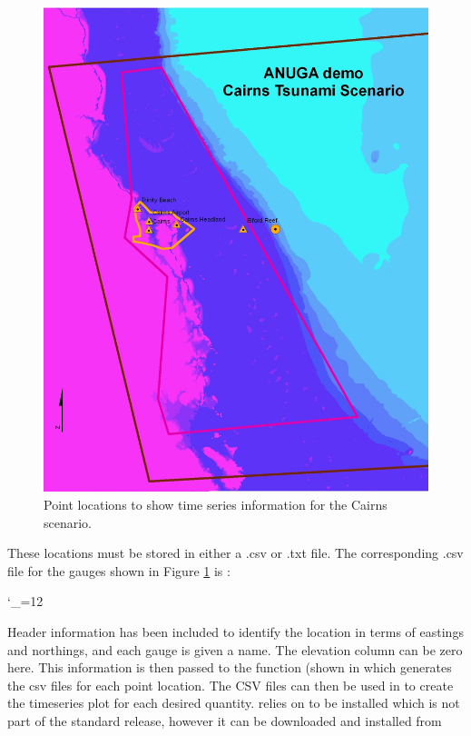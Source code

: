 \documentclass{manual}
\newcommand{\verbatiminputB}[1]{%
\endgroup}
\def\verbatiminputunderscore{\begingroup 
\catcode`\_=12
\verbatiminputB}
\begin{document}
\begin{figure}[htp]
  \centerline{\includegraphics[scale=0.5]{graphics/cairnsgauges.jpg}}
  \caption{Point locations to show time series information for the Cairns scenario.}
  \label{fig:cairnsgauges}
\end{figure}

These locations
must be stored in either a .csv or .txt file. The corresponding .csv file for
the gauges shown in Figure \ref{fig:cairnsgauges} is :

\verbatiminputunderscore{../../anuga_core/examples/cairns/gauges.csv}

Header information has been included to identify the location in terms of eastings and
northings, and each gauge is given a name. The elevation column can be zero here.
This information is then passed to the function  (shown in
 which generates the csv files for each point location. The CSV files
can then be used in  to create the timeseries plot for each desired
quantity.  relies on  to be installed which is not part
of the standard  release, however it can be downloaded and installed from 
\end{document}
